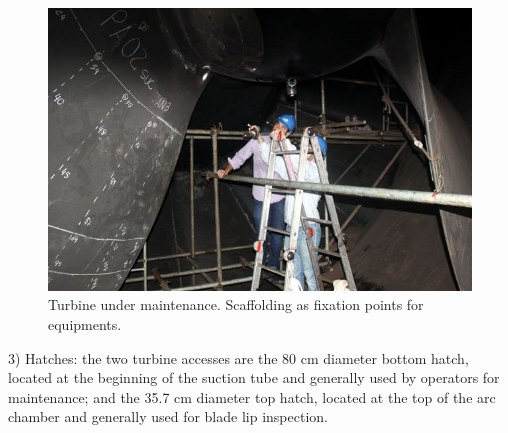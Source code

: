 
\begin{figure}[h!]	
	\includegraphics[width=\columnwidth]{figs/viagem/2015_04_28/UG/img_4969}
	\caption{Turbine under maintenance. Scaffolding as fixation points for
	equipments.}
	\label{fig::andaime}
\end{figure}

 
3) Hatches: the two turbine accesses are the 80 cm diameter bottom hatch,
located at the beginning of the suction tube and generally used by operators
for maintenance; and the 35.7 cm diameter top hatch, located at the top of the
arc chamber and generally used for blade lip inspection.


